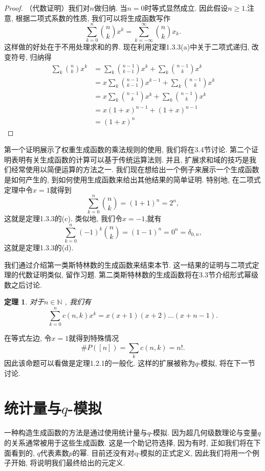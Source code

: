 \documentclass[a4paper,12pt]{ctexbook}
\newtheorem{theorem}[lemma]{\hspace{2em}定理}%
\begin{document}
\begin{proof}
	（代数证明）我们对$n$做归纳. 当$n=0$时等式显然成立. 因此假设$n\geq 1$.注意, 根据二项式系数的性质, 我们可以将生成函数写作\[
	\sum_{k=0}^{n}\binom{n}{k}x^{k}=\sum_{k=-\infty}^{\infty}\binom{n}{k}x_{k}.
	\]这样做的好处在于不用处理求和的界. 现在利用定理1.3.3(a)中关于二项式递归, 改变符号, 归纳得
\[
	\begin{aligned}
	\sum_{k}\binom{n}{k}x^{k} &=\sum_{k}\binom{n-1}{k-1}x^{k}+\sum_{k}\binom{n-1}{k}x^{k} \\
	&=x \sum_{k}\binom{n-1}{k-1} x^{k-1}+\sum_{k}\binom{n-1}{k}x^{k} \\
	&=x \sum_{k}\binom{n-1}{k}x^{k}+\sum_{k}\binom{n-1}{k}x^{k} \\
	&=x(1+x)^{n-1}+(1+x)^{n-1} \\
	&=(1+x)^{n}
	\end{aligned}
\]
\end{proof}
第一个证明展示了权重生成函数的乘法规则的使用, 我们将在3.4节讨论. 第二个证明表明有关生成函数的计算可以基于传统运算法则. 并且, 扩展求和域的技巧是我们经常使用以简便运算的方法之一. 我们现在想给出一个例子来展示一个生成函数是如何产生的, 到如何使用生成函数来给出其他结果的简单证明. 特别地, 在二项式定理中令$x=1$就得到
$$
\sum_{k=0}^{n}\binom{n}{k}=(1+1)^{n}=2^{n},
$$
这就是定理1.3.3的(c). 类似地, 我们令$x=-1$,就有
$$
\sum_{k=0}^{n}(-1)^{k}\binom{n}{k}=(1-1)^{n}=0^{n}=\delta_{0, n},
$$
这就是定理1.3.3的(d).

我们通过介绍第一类斯特林数的生成函数来结束本节. 这一结果的证明与二项式定理的代数证明类似, 留作习题. 第二类斯特林数的生成函数将在3.3节介绍形式幂级数之后讨论.
\begin{theorem}
	对于$n \in \mathbb{N}$ , 我们有\[
	\sum_{k=0}^{n} c(n, k) x^{k}=x(x+1)(x+2) \ldots(x+n-1).
	\]
\end{theorem}
在等式左边, 令$x=1$就得到特殊情况
$$
\# P([n])=\sum_{k} c(n, k)=n !.
$$
因此该命题可以看做是定理1.2.1的一般化. 这样的扩展被称为$q$-模拟, 将在下一节讨论.
\section{统计量与$q$-模拟}
一种构造生成函数的方法是通过使用统计量与$q$-模拟. 因为超几何级数理论与变量$q$的关系通常被用于这些生成函数. 这是一个助记符选择, 因为有时, 正如我们将在下面看到的, $q$代表素数$p$的幂. 目前还没有对q-模拟的正式定义, 因此我们将用一个例子开始, 将说明我们最终给出的元定义.
\end{document}
